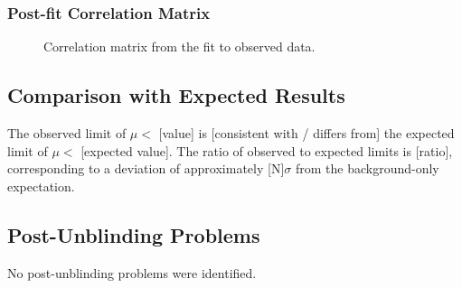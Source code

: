\subsubsection{Post-fit Correlation Matrix}

\begin{figure}[htbp]
  \centering
  \caption{Correlation matrix from the fit to observed data.}
  \label{fig:correlation_observed}
\end{figure}

\subsection{Comparison with Expected Results}
\label{sec:observed:comparison}


The observed limit of $\mu < $ [value] is [consistent with / differs from]
the expected limit of $\mu < $ [expected value]. The ratio of observed to
expected limits is [ratio], corresponding to a deviation of approximately
[N]$\sigma$ from the background-only expectation.

\subsection{Post-Unblinding Problems}
\label{sec:observed:problems}


No post-unblinding problems were identified.

